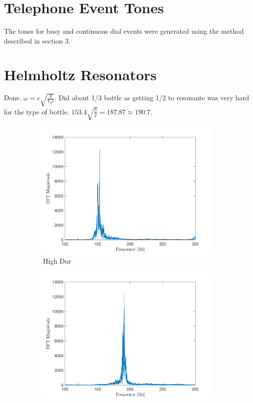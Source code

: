 \documentclass[10pt]{article}
\begin{document}
\section{Telephone Event Tones}
The tones for busy and continuous dial events were generated using the method described in section 3.

\section{Helmholtz Resonators}
Done. $\omega = c\sqrt{\frac{S}{V_0l}}$. Did about 1/3 bottle as getting 1/2 to resonante was very hard for the type of bottle. $153.4\sqrt{\frac{3}{2}} = 187.87 \approx 190.7$.

\begin{figure}[ht]
    \centering
    \begin{subfigure}[b]{0.48\textwidth}
        \includegraphics[width=\textwidth]{problem6_empty_bottle_resonance_spectra.pdf}
        \caption{High Dur}
    \end{subfigure}
    \quad
    \begin{subfigure}[b]{0.48\textwidth}
        \includegraphics[width=\textwidth]{problem6_filled_bottle_resonance_spectra.pdf}

\end{subfigure}
\end{figure}
\end{document}
